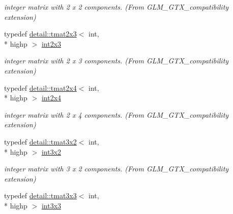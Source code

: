 \begin{DoxyCompactItemize}
\begin{DoxyCompactList}\small\item\em integer matrix with 2 x 2 components. (From G\-L\-M\-\_\-\-G\-T\-X\-\_\-compatibility extension) \end{DoxyCompactList}\item 
\hypertarget{group__gtx__compatibility_ga42c3d6e4924de559104b9ca2b127c9ac}{typedef \hyperlink{structglm_1_1detail_1_1tmat2x3}{detail\-::tmat2x3}$<$ int, \\*
highp $>$ \hyperlink{group__gtx__compatibility_ga42c3d6e4924de559104b9ca2b127c9ac}{int2x3}}\label{group__gtx__compatibility_ga42c3d6e4924de559104b9ca2b127c9ac}

\begin{DoxyCompactList}\small\item\em integer matrix with 2 x 3 components. (From G\-L\-M\-\_\-\-G\-T\-X\-\_\-compatibility extension) \end{DoxyCompactList}\item 
\hypertarget{group__gtx__compatibility_ga145a388c0d988490d6ce901a664faf50}{typedef \hyperlink{structglm_1_1detail_1_1tmat2x4}{detail\-::tmat2x4}$<$ int, \\*
highp $>$ \hyperlink{group__gtx__compatibility_ga145a388c0d988490d6ce901a664faf50}{int2x4}}\label{group__gtx__compatibility_ga145a388c0d988490d6ce901a664faf50}

\begin{DoxyCompactList}\small\item\em integer matrix with 2 x 4 components. (From G\-L\-M\-\_\-\-G\-T\-X\-\_\-compatibility extension) \end{DoxyCompactList}\item 
\hypertarget{group__gtx__compatibility_ga2b1f3046fb4692c0c2f76b3933389868}{typedef \hyperlink{structglm_1_1detail_1_1tmat3x2}{detail\-::tmat3x2}$<$ int, \\*
highp $>$ \hyperlink{group__gtx__compatibility_ga2b1f3046fb4692c0c2f76b3933389868}{int3x2}}\label{group__gtx__compatibility_ga2b1f3046fb4692c0c2f76b3933389868}

\begin{DoxyCompactList}\small\item\em integer matrix with 3 x 2 components. (From G\-L\-M\-\_\-\-G\-T\-X\-\_\-compatibility extension) \end{DoxyCompactList}\item 
\hypertarget{group__gtx__compatibility_ga8773c9f240dcac9f28d1afef71f7f779}{typedef \hyperlink{structglm_1_1detail_1_1tmat3x3}{detail\-::tmat3x3}$<$ int, \\*
highp $>$ \hyperlink{group__gtx__compatibility_ga8773c9f240dcac9f28d1afef71f7f779}{int3x3}}\label{group__gtx__compatibility_ga8773c9f240dcac9f28d1afef71f7f779}


\end{DoxyCompactItemize}
